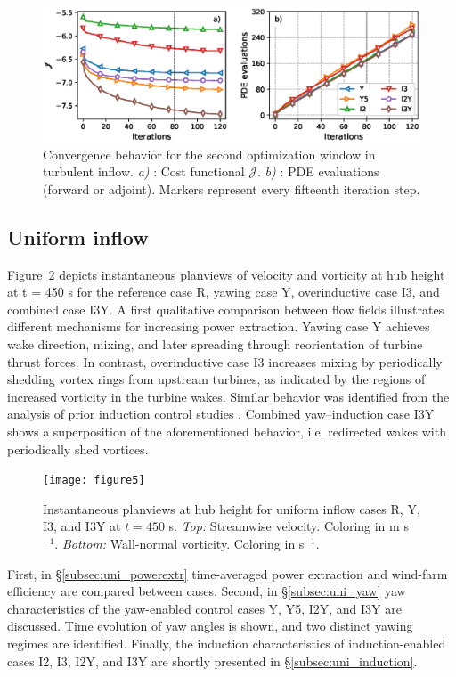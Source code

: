 \documentclass[energies,article,submit,moreauthors,latex,10pt,a4paper]{mdpi}
\newcommand{\revision}[1]{{\color{red} #1}}
\begin{document}
\begin{figure}
	\includegraphics[width=\textwidth]{figure4_revised}
	\caption{Convergence behavior for the second optimization window in \revision{turbulent} inflow. \emph{a) }: Cost functional $\mathscr{J}$. \emph{b) }: PDE evaluations (forward or adjoint). Markers represent every fifteenth iteration step.\label{fig:convergence}}
\end{figure}

\subsection{Uniform inflow}\label{sec:opt_yaw_uniform}
\noindent Figure~\ref{fig:flowfield_uniform} depicts instantaneous planviews of velocity and vorticity at hub height at t = 450 s for the reference case R, yawing case Y, overinductive case I3, and combined case I3Y. 
A first qualitative comparison between flow fields illustrates different mechanisms for increasing power extraction. Yawing case Y achieves wake direction, mixing, and later spreading through reorientation of turbine thrust forces. In contrast, overinductive case I3 increases mixing by periodically shedding vortex rings from upstream turbines, as indicated by the regions of increased vorticity in the turbine wakes. Similar behavior was identified from the analysis of prior induction control studies \cite{muntersphd}. Combined yaw--induction case I3Y shows a superposition of the aforementioned behavior, i.e. redirected wakes with periodically shed vortices. 


\begin{figure}
	\texttt{[image: figure5]}
	\caption{Instantaneous planviews at hub height for uniform inflow cases R, Y, I3, and I3Y at $t= 450$ s. \emph{Top: } Streamwise velocity. Coloring in m s$^{-1}$. \emph{Bottom: } Wall-normal vorticity. Coloring in s$^{-1}$. \label{fig:flowfield_uniform}}
\end{figure}

First, in \S\ref{subsec:uni_powerextr} time-averaged power extraction and wind-farm efficiency are compared between cases. Second, in \S\ref{subsec:uni_yaw} yaw characteristics of the yaw-enabled control cases Y, Y5, I2Y, and I3Y are discussed. Time evolution of yaw angles is shown, and two distinct yawing regimes are identified. Finally, the induction characteristics of induction-enabled cases I2, I3, I2Y, and I3Y are shortly presented in \S\ref{subsec:uni_induction}.
\end{document}
